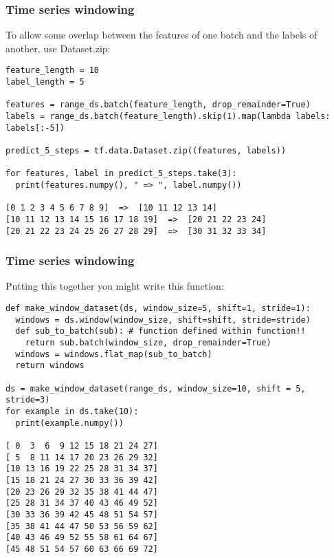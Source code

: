 \begin{frame}[fragile]\frametitle{Time series windowing}

To allow some overlap between the features of one batch and the labels of another, use Dataset.zip:



\begin{lstlisting}
feature_length = 10
label_length = 5

features = range_ds.batch(feature_length, drop_remainder=True)
labels = range_ds.batch(feature_length).skip(1).map(lambda labels: labels[:-5])

predict_5_steps = tf.data.Dataset.zip((features, labels))

for features, label in predict_5_steps.take(3):
  print(features.numpy(), " => ", label.numpy())
	
[0 1 2 3 4 5 6 7 8 9]  =>  [10 11 12 13 14]
[10 11 12 13 14 15 16 17 18 19]  =>  [20 21 22 23 24]
[20 21 22 23 24 25 26 27 28 29]  =>  [30 31 32 33 34]
\end{lstlisting}
\end{frame}

\begin{frame}[fragile]\frametitle{Time series windowing}

Putting this together you might write this function:

\begin{lstlisting}
def make_window_dataset(ds, window_size=5, shift=1, stride=1):
  windows = ds.window(window_size, shift=shift, stride=stride)
  def sub_to_batch(sub): # function defined within function!!
    return sub.batch(window_size, drop_remainder=True)
  windows = windows.flat_map(sub_to_batch)
  return windows

ds = make_window_dataset(range_ds, window_size=10, shift = 5, stride=3)
for example in ds.take(10):
  print(example.numpy())
	
[ 0  3  6  9 12 15 18 21 24 27]
[ 5  8 11 14 17 20 23 26 29 32]
[10 13 16 19 22 25 28 31 34 37]
[15 18 21 24 27 30 33 36 39 42]
[20 23 26 29 32 35 38 41 44 47]
[25 28 31 34 37 40 43 46 49 52]
[30 33 36 39 42 45 48 51 54 57]
[35 38 41 44 47 50 53 56 59 62]
[40 43 46 49 52 55 58 61 64 67]
[45 48 51 54 57 60 63 66 69 72]
\end{lstlisting}
\end{frame}

